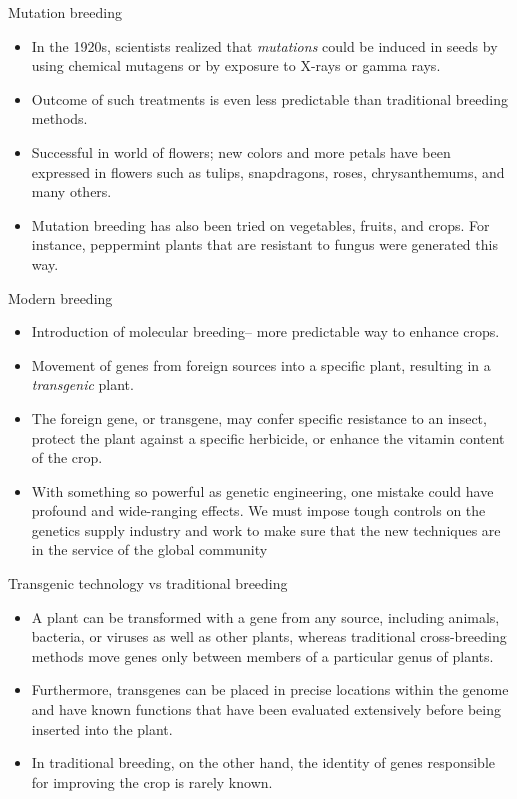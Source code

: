 \documentclass[
  ignorenonframetext,
  aspectratio=169]{beamer}
\providecommand{\tightlist}{%
  \setlength{\itemsep}{0pt}\setlength{\parskip}{0pt}}
\begin{document}
\begin{frame}{Mutation breeding}
\protect\hypertarget{mutation-breeding}{}
\begin{itemize}
\tightlist
\item
  In the 1920s, scientists realized that \emph{mutations} could be
  induced in seeds by using chemical mutagens or by exposure to X-rays
  or gamma rays.
\item
  Outcome of such treatments is even less predictable than traditional
  breeding methods.
\item
  Successful in world of flowers; new colors and more petals have been
  expressed in flowers such as tulips, snapdragons, roses,
  chrysanthemums, and many others.
\item
  Mutation breeding has also been tried on vegetables, fruits, and
  crops. For instance, peppermint plants that are resistant to fungus
  were generated this way.
\end{itemize}
\end{frame}

\begin{frame}{Modern breeding}
\protect\hypertarget{modern-breeding}{}
\begin{itemize}
\tightlist
\item
  Introduction of molecular breeding-- more predictable way to enhance
  crops.
\item
  Movement of genes from foreign sources into a specific plant,
  resulting in a \emph{transgenic} plant.
\item
  The foreign gene, or transgene, may confer specific resistance to an
  insect, protect the plant against a specific herbicide, or enhance the
  vitamin content of the crop.
\item
  With something so powerful as genetic engineering, one mistake could
  have profound and wide-ranging effects. We must impose tough controls
  on the genetics supply industry and work to make sure that the new
  techniques are in the service of the global community
\end{itemize}
\end{frame}

\begin{frame}{Transgenic technology vs traditional breeding}
\protect\hypertarget{transgenic-technology-vs-traditional-breeding}{}
\begin{itemize}
\tightlist
\item
  A plant can be transformed with a gene from any source, including
  animals, bacteria, or viruses as well as other plants, whereas
  traditional cross-breeding methods move genes only between members of
  a particular genus of plants.
\item
  Furthermore, transgenes can be placed in precise locations within the
  genome and have known functions that have been evaluated extensively
  before being inserted into the plant.
\item
  In traditional breeding, on the other hand, the identity of genes
  responsible for improving the crop is rarely known.
\end{itemize}
\end{frame}
\end{document}
